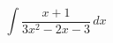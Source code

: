 \documentclass[../rgr1.tex]{subfiles}
\begin{document}
\Solution

\begin{equation}
	\int \frac{x + 1}{3x^2 - 2x - 3} \, dx
\end{equation}

\Answer{
	<++>
}
\end{document}
